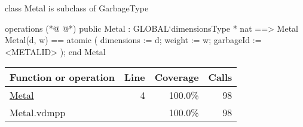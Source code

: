 \begin{vdmpp}[breaklines=true]
class Metal is subclass of GarbageType

operations
(*@
\label{Metal:4}
@*)
public Metal : GLOBAL`dimensionsType * nat ==> Metal
Metal(d, w) == 
    atomic 
    (
        dimensions := d;
        weight := w;
        garbageId := <METALID>
    );
end Metal
\end{vdmpp}
\bigskip
\begin{longtable}{|l|r|r|r|}
\hline
Function or operation & Line & Coverage & Calls \\
\hline
\hline
\hyperref[Metal:4]{Metal} & 4&100.0\% & 98 \\
\hline
\hline
Metal.vdmpp & & 100.0\% & 98 \\
\hline
\end{longtable}

